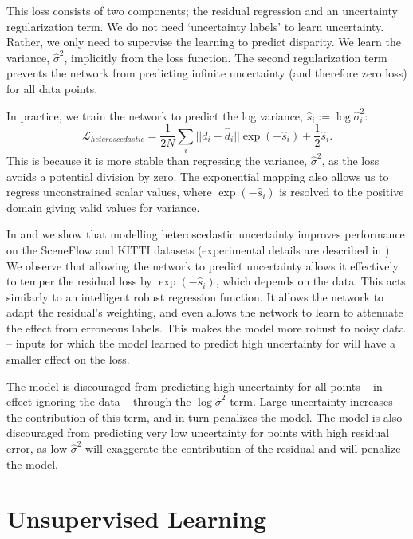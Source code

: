 This loss consists of two components; the residual regression and an uncertainty regularization term. We do not need `uncertainty labels' to learn uncertainty. Rather, we only need to supervise the learning to predict disparity. We learn the variance, $\hat{\sigma}^2$, implicitly from the loss function. The second regularization term prevents the network from predicting infinite uncertainty (and therefore zero loss) for all data points.

In practice, we train the network to predict the log variance, $\hat{s}_i := \log \hat{\sigma}_i^2$: 
\begin{equation}
\mathcal{L}_{heteroscedastic} = \frac{1}{2N} \sum_i ||d_i-\hat{d}_i|| \exp (-\hat{s}_i) + \frac{1}{2}\hat{s}_i.
\label{eqn:aleatoric_regression_loss2}
\end{equation}
This is because it is more stable than regressing the variance, $\hat{\sigma}^2$, as the loss avoids a potential division by zero. The exponential mapping also allows us to regress unconstrained scalar values, where $\exp(-\hat{s}_i)$ is resolved to the positive domain giving valid values for variance.

In  and  we show that modelling heteroscedastic uncertainty improves performance on the SceneFlow and KITTI datasets (experimental details are described in ). We observe that allowing the network to predict uncertainty allows it effectively to temper the residual loss by $\exp(-\hat{s}_i)$, which depends on the data. This acts similarly to an intelligent robust regression function. It allows the network to adapt the residual's weighting, and even allows the network to learn to attenuate the effect from erroneous labels. This makes the model more robust to noisy data -- inputs for which the model learned to predict high uncertainty for will have a smaller effect on the loss.

The model is discouraged from predicting high uncertainty for all points -- in effect ignoring the data -- through the $\log \hat{\sigma}^2$ term. Large uncertainty increases the contribution of this term, and in turn penalizes the model. The model is also discouraged from predicting very low uncertainty for points with high residual error, as low $\hat{\sigma}^2$ will exaggerate the contribution of the residual and will penalize the model.

\section{Unsupervised Learning}
\label{sec:unsupervised}

